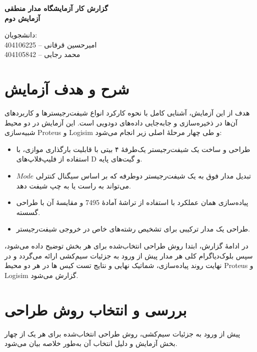 \documentclass[12pt]{article}
\begin{document}
\begin{center}
    \Large \textbf{گزارش کار آزمایشگاه مدار منطقی} \\[0.5em]
    \textbf{آزمایش دوم}
\end{center}

\vspace{2em}

\begin{center}
    دانشجویان:\\
    امیرحسین قرقانی -- 404106225\\
    محمد رجایی -- 404105842
\end{center}

\newpage

\section{شرح و هدف آزمایش}

هدف از این آزمایش، آشنایی کامل با نحوه کارکرد انواع شیفت‌رجیسترها و کاربردهای آن‌ها در ذخیره‌سازی و جابه‌جایی داده‌های دودویی است. این آزمایش در دو محیط شبیه‌سازی Proteus و Logisim و طی چهار مرحلهٔ اصلی زیر انجام می‌شود:

\begin{itemize}
    \item طراحی و ساخت یک شیفت‌رجیستر یک‌طرفهٔ ۴ بیتی با قابلیت بارگذاری موازی، با استفاده از فلیپ‌فلاپ‌های D و گیت‌های پایه.
    \item تبدیل مدار فوق به یک شیفت‌رجیستر دوطرفه که بر اساس سیگنال کنترلی $Mode$ می‌تواند به راست یا به چپ شیفت دهد.
    \item پیاده‌سازی همان عملکرد با استفاده از تراشهٔ آمادهٔ 7495 و مقایسهٔ آن با طراحی گسسته.
    \item طراحی یک مدار ترکیبی برای تشخیص رشته‌های خاص در خروجی شیفت‌رجیستر.
\end{itemize}

در ادامهٔ گزارش، ابتدا روش طراحی انتخاب‌شده برای هر بخش توضیح داده می‌شود، سپس بلوک‌دیاگرام کلی هر مدار پیش از ورود به جزئیات سیم‌کشی ارائه می‌گردد و در نهایت روند پیاده‌سازی، شماتیک نهایی و نتایج تست کیس ها در هر دو محیط Proteus و Logisim گزارش می‌شود.

\section{بررسی و انتخاب روش طراحی}

پیش از ورود به جزئیات سیم‌کشی، روش طراحی انتخاب‌شده برای هر یک از چهار بخش آزمایش و دلیل انتخاب آن به‌طور خلاصه بیان می‌شود.
\end{document}
